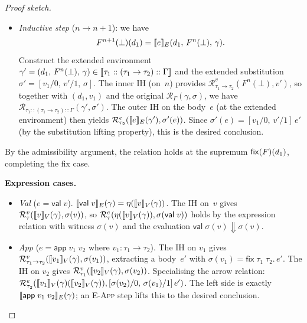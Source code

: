 \begin{proof}[Proof sketch]
\begin{itemize}
\begin{itemize}
      \item \emph{Inductive step} ($n \to n{+}1$): we have
        \[
          F^{n+1}(\bot)(d_1) = \llbracket e \rrbracket_E(d_1,\, F^n(\bot),\, \gamma).
        \]
        Construct the extended environment
        $\gamma' = (d_1,\, F^n(\bot),\, \gamma) \in
        \llbracket \tau_1 :: (\tau_1 \to \tau_2) :: \Gamma \rrbracket$
        and the extended substitution
        $\sigma' = [v_1/0,\, v'/1,\, \sigma]$.  The inner IH (on~$n$)
        provides
        $\mathcal{R}^v_{\tau_1 \to \tau_2}(F^n(\bot), v')$, so
        together with $(d_1, v_1)$ and the original
        $\mathcal{R}_\Gamma(\gamma, \sigma)$, we have
        $\mathcal{R}_{\tau_1 :: (\tau_1 \to \tau_2) :: \Gamma}
        (\gamma', \sigma')$.
        The outer IH on the body~$e$ (at the extended environment) then
        yields
        $\mathcal{R}^e_{\tau_2}(\llbracket e \rrbracket_E(\gamma'), \sigma'(e))$.
        Since $\sigma'(e) = [v_1/0,\, v'/1]\,e'$ (by the substitution
        lifting property), this is the desired conclusion.
    \end{itemize}

    By the admissibility argument, the relation holds at the supremum
    $\mathsf{fix}(F)(d_1)$, completing the fix case.
\end{itemize}

\medskip\noindent
\textbf{Expression cases.}
\begin{itemize}
  \item \emph{Val} ($e = \mathsf{val}\;v$).
    $\llbracket \mathsf{val}\;v \rrbracket_E(\gamma) = \eta(\llbracket v \rrbracket_V(\gamma))$.  The
    IH on~$v$ gives $\mathcal{R}^v_\tau(\llbracket v \rrbracket_V(\gamma), \sigma(v))$,
    so $\mathcal{R}^e_\tau(\eta(\llbracket v \rrbracket_V(\gamma)),
    \sigma(\mathsf{val}\;v))$ holds by the expression relation with
    witness $\sigma(v)$ and the evaluation $\mathsf{val}\;\sigma(v)
    \Downarrow \sigma(v)$.

  \item \emph{App} ($e = \mathsf{app}\;v_1\;v_2$ where
    $v_1 : \tau_1 \to \tau_2$).  The IH on $v_1$ gives
    $\mathcal{R}^v_{\tau_1 \to \tau_2}(\llbracket v_1 \rrbracket_V(\gamma),
    \sigma(v_1))$, extracting a body~$e'$ with
    $\sigma(v_1) = \mathsf{fix}\;\tau_1\;\tau_2.\,e'$.  The IH on
    $v_2$ gives
    $\mathcal{R}^v_{\tau_1}(\llbracket v_2 \rrbracket_V(\gamma), \sigma(v_2))$.
    Specialising the arrow relation:
    $\mathcal{R}^e_{\tau_2}(\llbracket v_1 \rrbracket_V(\gamma)(\llbracket v_2 \rrbracket_V(\gamma)),
    [\sigma(v_2)/0,\, \sigma(v_1)/1]\,e')$.
    The left side is exactly $\llbracket \mathsf{app}\;v_1\;v_2 \rrbracket_E(\gamma)$;
    an \textsc{E-App} step lifts this to the desired conclusion.


\end{itemize}
\end{proof}
